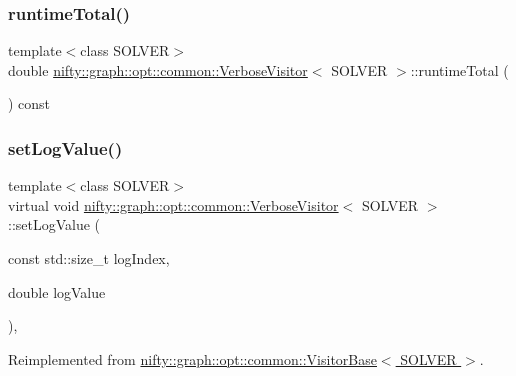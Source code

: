 \subsubsection{\texorpdfstring{runtime\+Total()}{runtimeTotal()}}
{\footnotesize\ttfamily template$<$class S\+O\+L\+V\+ER$>$ \\
double \hyperlink{classnifty_1_1graph_1_1opt_1_1common_1_1VerboseVisitor}{nifty\+::graph\+::opt\+::common\+::\+Verbose\+Visitor}$<$ S\+O\+L\+V\+ER $>$\+::runtime\+Total (\begin{DoxyParamCaption}{ }\end{DoxyParamCaption}) const\hspace{0.3cm}{\ttfamily [inline]}}

\mbox{\label{classnifty_1_1graph_1_1opt_1_1common_1_1VerboseVisitor_a4f01ae337ac5fedf5ad178c883cd0153}} 
\subsubsection{\texorpdfstring{set\+Log\+Value()}{setLogValue()}}
{\footnotesize\ttfamily template$<$class S\+O\+L\+V\+ER$>$ \\
virtual void \hyperlink{classnifty_1_1graph_1_1opt_1_1common_1_1VerboseVisitor}{nifty\+::graph\+::opt\+::common\+::\+Verbose\+Visitor}$<$ S\+O\+L\+V\+ER $>$\+::set\+Log\+Value (\begin{DoxyParamCaption}\item[{const std\+::size\+\_\+t}]{log\+Index,  }\item[{double}]{log\+Value }\end{DoxyParamCaption})\hspace{0.3cm}{\ttfamily [inline]}, {\ttfamily [virtual]}}



Reimplemented from \hyperlink{classnifty_1_1graph_1_1opt_1_1common_1_1VisitorBase_a41efc013731cca97176a61be58db0094}{nifty\+::graph\+::opt\+::common\+::\+Visitor\+Base$<$ S\+O\+L\+V\+E\+R $>$}.

\mbox{\label{classnifty_1_1graph_1_1opt_1_1common_1_1VerboseVisitor_ad723638f9bc640bf6ee2db68e59840d4}} 
